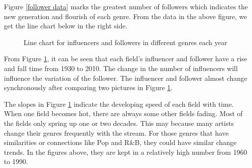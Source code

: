 \documentclass[12pt]{article}
\begin{document}
Figure \ref{follower data} marks the greatest number of followers which indicates the new generation and flourish of each genre. From the data in the above figure, we get the line chart below in the right side.
\begin{figure}[H]
\centering
{}
\caption{Line chart for influencers and followers in different genres each year}
\label{line chart}
\end{figure}


From Figure \ref{line chart}, it can be seen that each field’s influencer and follower have a rise and fall time from 1930 to 2010. The change in the number of influencers will influence the variation of the follower. The influencer and follower almost change synchronously after comparing two pictures in Figure \ref{line chart}. 

The slopes in Figure \ref{line chart} indicate the developing speed of each field with time. When one field becomes hot, there are always some other fields fading. Most of the fields only spring up one or two decades. This may because many artists change their genres frequently with the stream. For those genres that have similarities or connections like Pop and R\&B, they could have similar change trends. In the figures above, they are kept in a relatively high number from 1960 to 1990.
\end{document}
